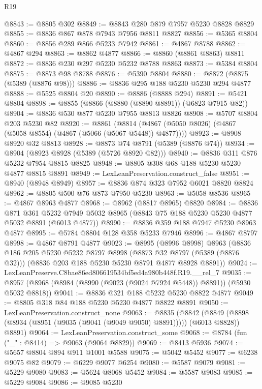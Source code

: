 \begin{lexlean}{R19}
\begin{coremodule}
@8843 := @8805 @302
@8849 := @8843 @280 @879 @7957 @5230 @8828 @8829
@8855 := @8836 @867 @878 @7943 @7956 @8811 @8827
@8856 := @5365 @8804
@8860 := @8856 @289 @866 @5233 @7942
@8861 := @4867 @8788
@8862 := @4867 @294
@8863 := @8862 @4877
@8866 := @8860 (@8861 @8863) @8811
@8872 := @8836 @230 @297 @5230 @5232 @8788 @8863
@8873 := @5384 @8804
@8875 := @8873 @98 @8788
@8876 := @5390 @8804
@8880 := @8872 (@8875 (@5389 (@8876 @98)))
@8886 := @8836 @295 @188 @5230 @5230 @294 @4877
@8888 := @5525 @8804 @20
@8890 := @8886 (@8888 @294)
@8891 := @5421 @8804
@8898 := @8855 (@8866 (@8880 (@8890 @8891)) (@6823 @7915 @82))
@8904 := @8836 @530 @877 @5230 @7955 @8813 @8826
@8908 := @5707 @8804 @203 @5230 @82
@8920 := @8861
    (@8814 (@4867 (@5050 @8026) (@4867 (@5058 @8554) (@4867 (@5066 (@5067 @5448)) @4877))))
@8923 := @8908 @8920 @32 @8813
@8928 := @8873 @74 @8791 (@5389 (@8876 @74))
@8934 := @8904 (@8923 @8928 (@5389 (@5726 @8920 @82)))
@8940 := @8836 @311 @876 @5232 @7954 @8815 @8825
@8948 := @8805 @308 @68 @188 @5230 @5230 @4877 @8815 @8891
@8949 := LexLeanPreservation.construct_false
@8951 := @8940 (@8948 @8949)
@8957 := @8836 @874 @323 @7952 @6021 @8820 @8824
@8962 := @8805 @500 @76 @873 @7950 @5230
@8963 := @5058 @8536
@8965 := @4867 @8963 @4877
@8968 := @8962 (@8817 @8965) @8820
@8984 := @8836
    @871
    @361
    @5232
    @7949
    @5032
    @8965
    (@8843 @75 @188 @5230 @5230 @4877 @5032 @8891 (@6013 @4877))
@8990 := @8836 @359 @188 @7947 @5230 @8963 @4877
@8995 := @5784 @8804 @128 @358 @5233 @7946
@8996 := @4867 @8797
@8998 := @4867 @8791 @4877
@9023 := @8995
    (@8996 @8998)
    @8963
    (@8836
      @186
      @205
      @5230
      @5232
      @8797
      @8998
      (@8873 @32 @8797 (@5389 (@8876 @32)))
      (@8836 @203 @188 @5230 @5230 @8791 @4877 @8928 @8891))
@9024 := LexLeanPreserve.C8bae86ed806619534bf5ed4a980b448f.R19.__rel_7
@9035 := @8957 (@8968 (@8984 (@8990 (@9023 (@9024 @7924 @5448)) @8891)) (@5930 @5032 @8818))
@9041 := @8836 @321 @188 @5232 @5230 @8822 @4877
@9049 := @8805 @318 @84 @188 @5230 @5230 @4877 @8822 @8891
@9050 := LexLeanPreservation.construct_none
@9063 := @8835
    (@8842 (@8849 (@8898 (@8934 (@8951 (@9035 (@9041 (@9049 @9050) @8891))))) (@6013 @8828)) @8891)
@9064 := LexLeanPreservation.construct_some
@9068 := @8784 (fun ("_" : @8414) => @9063 (@9064 @8829))
@9069 := @8413 @5936
@9074 := @5657 @8804 @894 @911 @1001 @5588
@9075 := @5042 @5452
@9077 := @6238 @9075 @82
@9079 := @6229 @9077 @6254
@9080 := @5587 @9079
@9081 := @5229 @9080
@9083 := @5624 @8068 @5452
@9084 := @5587 @9083
@9085 := @5229 @9084
@9086 := @9085 @5230

\end{coremodule}
\end{lexlean}
